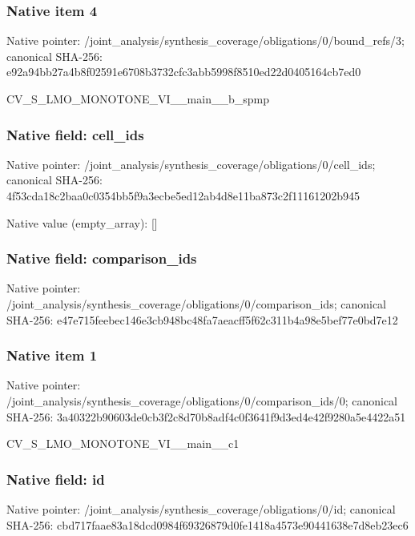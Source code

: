 \documentclass[10pt,a4paper]{article}
\begin{document}
\subsubsection{Native item 4}
Native pointer: /joint\_\allowbreak{}analysis/synthesis\_\allowbreak{}coverage/obligations/0/bound\_\allowbreak{}refs/3; canonical SHA-256: e92a94bb27a4b8f02591e6708b3732cfc3abb5998f8510ed22d0405164cb7ed0

\begingroup\raggedright\sloppy CV\_\allowbreak{}S\_\allowbreak{}LMO\_\allowbreak{}MONOTONE\_\allowbreak{}VI\_\allowbreak{}\_\allowbreak{}main\_\allowbreak{}\_\allowbreak{}b\_\allowbreak{}spmp\par\endgroup

\subsubsection{Native field: cell\_\allowbreak{}ids}
Native pointer: /joint\_\allowbreak{}analysis/synthesis\_\allowbreak{}coverage/obligations/0/cell\_\allowbreak{}ids; canonical SHA-256: 4f53cda18c2baa0c0354bb5f9a3ecbe5ed12ab4d8e11ba873c2f11161202b945

Native value (empty\_\allowbreak{}array): []

\subsubsection{Native field: comparison\_\allowbreak{}ids}
Native pointer: /joint\_\allowbreak{}analysis/synthesis\_\allowbreak{}coverage/obligations/0/comparison\_\allowbreak{}ids; canonical SHA-256: e47e715feebec146e3cb948bc48fa7aeacff5f62c311b4a98e5bef77e0bd7e12

\subsubsection{Native item 1}
Native pointer: /joint\_\allowbreak{}analysis/synthesis\_\allowbreak{}coverage/obligations/0/comparison\_\allowbreak{}ids/0; canonical SHA-256: 3a40322b90603de0cb3f2c8d70b8adf4c0f3641f9d3ed4e42f9280a5e4422a51

\begingroup\raggedright\sloppy CV\_\allowbreak{}S\_\allowbreak{}LMO\_\allowbreak{}MONOTONE\_\allowbreak{}VI\_\allowbreak{}\_\allowbreak{}main\_\allowbreak{}\_\allowbreak{}c1\par\endgroup

\subsubsection{Native field: id}
Native pointer: /joint\_\allowbreak{}analysis/synthesis\_\allowbreak{}coverage/obligations/0/id; canonical SHA-256: cbd717faae83a18dcd0984f69326879d0fe1418a4573e90441638e7d8eb23ec6
\end{document}
